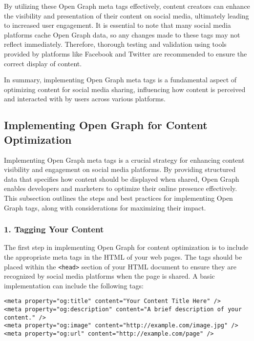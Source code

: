 By utilizing these Open Graph meta tags effectively, content creators can enhance the visibility and presentation of their content on social media, ultimately leading to increased user engagement. It is essential to note that many social media platforms cache Open Graph data, so any changes made to these tags may not reflect immediately. Therefore, thorough testing and validation using tools provided by platforms like Facebook and Twitter are recommended to ensure the correct display of content.

In summary, implementing Open Graph meta tags is a fundamental aspect of optimizing content for social media sharing, influencing how content is perceived and interacted with by users across various platforms.

\subsection{Implementing Open Graph for Content Optimization}
\label{subsec:implementing_open_graph_content_optimization}

Implementing Open Graph meta tags is a crucial strategy for enhancing content visibility and engagement on social media platforms. By providing structured data that specifies how content should be displayed when shared, Open Graph enables developers and marketers to optimize their online presence effectively. This subsection outlines the steps and best practices for implementing Open Graph tags, along with considerations for maximizing their impact.

\subsubsection{1. Tagging Your Content}

The first step in implementing Open Graph for content optimization is to include the appropriate meta tags in the HTML of your web pages. The tags should be placed within the \texttt{<head>} section of your HTML document to ensure they are recognized by social media platforms when the page is shared. A basic implementation can include the following tags:

\begin{verbatim}
<meta property="og:title" content="Your Content Title Here" />
<meta property="og:description" content="A brief description of your content." />
<meta property="og:image" content="http://example.com/image.jpg" />
<meta property="og:url" content="http://example.com/page" />
\end{verbatim}

